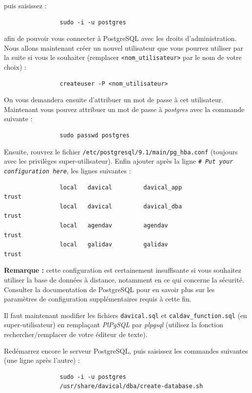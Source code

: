 \documentclass[a4paper, 11pt]{report}
\begin{document}
			puis saisissez :
			\begin{verbatim}
				sudo -i -u postgres
			\end{verbatim}

			afin de pouvoir vous connecter à PostgreSQL avec les droits d’administration. Nous allons maintenant créer un nouvel utilisateur que vous pourrez utiliser par la suite si vous le souhaiter (remplacer \texttt{<nom\_utilisateur>} par le nom de votre choix) :
			\begin{verbatim}
				createuser -P <nom_utilisateur>
			\end{verbatim}

			On vous demandera ensuite d’attribuer un mot de passe à cet utilisateur. Maintenant vous pouvez attribuer un mot de passe à \textit{postgres} avec la commande suivante :
			\begin{verbatim}
				sudo passwd postgres
			\end{verbatim}

			Ensuite, rouvrez le fichier \texttt{/etc/postgresql/9.1/main/pg\_hba.conf} (toujours avec les privilèges super-utilisateur). Enfin ajouter après la ligne \texttt{\textit{\# Put your configuration here}}, les lignes suivantes :
			\begin{verbatim}
				local   davical         davical_app                             trust
				local   davical         davical_dba                             trust
				local   agendav         agendav                                 trust
				local   galidav         galidav                                 trust
			\end{verbatim}

			\textbf{Remarque :} cette configuration est certainement insuffisante si vous souhaitez utiliser la base de données à distance, notamment en ce qui concerne la sécurité. Consulter la documentation de PostgreSQL pour en savoir plus sur les paramètres de configuration supplémentaires requis à cette fin. \newline

			Il faut maintenant modifier les fichiers \texttt{davical.sql} et \texttt{caldav\_function.sql} (en super-utilisateur) en remplaçant \emph{PlPgSQL} par \emph{plpgsql} (utilisez la fonction rechercher/remplacer de votre éditeur de texte).  

			Redémarrez encore le serveur PostgreSQL, puis saisissez les commandes suivantes (une ligne après l’autre) :
			\begin{verbatim}
				sudo -i -u postgres
				/usr/share/davical/dba/create-database.sh
			\end{verbatim}
\end{document}
